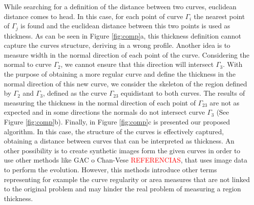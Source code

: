 \documentclass{article}
\begin{document}
While searching for a definition of the distance between two curves,
euclidean distance comes to head. In this case, for each point of
curve $\Gamma_i$ the nearest point of $\Gamma_j$ is found and the
euclidean distance between this two points is used as thickness. As
can be seen in Figure \ref{fig:comp}a, this thickness definition
cannot capture the curves structure, deriving in a wrong
profile. Another idea is to measure width in the normal direction of
each point of the curve. Considering the normal to curve $\Gamma_2$,
we cannot ensure that this direction will intersect $\Gamma_3$. With
the purpose of obtaining a more regular curve and define the thickness
in the normal direction of this new curve, we consider the skeleton of
the region defined by $\Gamma_2$ and $\Gamma_3$, defined as the curve
$\Gamma_{23}$ equidistant to both curves. The results of measuring the
thickness in the normal direction of each point of $\Gamma_{23}$ are
not as expected and in some directions the normals do not intersect
curve $\Gamma_3$ (See Figure \ref{fig:comp}b). Finally, in Figure
\ref{fig:comp}c is presented our proposed algorithm. In this case, the
structure of the curves is effectively captured, obtaining a distance
between curves that can be interpreted as thickness.  An other
possibility is to create synthetic images form the given curves in
order to use other methods like GAC o Chan-Vese
\textcolor{red}{REFERENCIAS}, that uses image data to perform the
evolution. However, this methods introduce other terms representing
for example the curve regularity or area measures that are not linked
to the original problem and may hinder the real problem of measuring a
region thickness.
\end{document}
